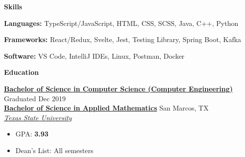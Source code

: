 \documentclass[10pt]{article}
\newlength{\headingborderwidth}
\newcommand{\resheading}[1]{
    \begin{mdframed}[
        backgroundcolor=black!15,
        linewidth=\headingborderwidth,
        innertopmargin=4pt,
        innerbottommargin=4pt,
        skipabove=6pt,
        skipbelow=2pt]
        \textbf{\large #1}
    \end{mdframed}
}
\newcommand{\dressubheading}[5]{
    \textbf{#1} \hfill #2 \\[0pt]
    \textbf{#3} \hfill #4 \\[0pt]
    \textit{#5} \\[0pt]
}
\newcommand{\ressubheading}[4]{
    \textbf{#1} \hfill #2 \\[0pt]
    \textit{#3} \hfill #4 \\[0pt]
}
\newenvironment{resitemize}{
    \vspace{-6pt}
    \begin{itemize}
    \setlength\itemsep{-2pt}
}{
    \end{itemize}
}
\begin{document}
\begin{NoHyper}
\resheading{Skills}

\textbf{Languages:}
    TypeScript/JavaScript,
    HTML,
    CSS,
    SCSS,
    Java,    
    C++,
    Python

\textbf{Frameworks:}
    React/Redux,
    Svelte,
    Jest,
    Testing Library,
    Spring Boot,
    Kafka

\textbf{Software:}
    VS Code,
    IntelliJ IDEs,
    Linux,
    Postman,
    Docker









%
%

\resheading{Education}

\dressubheading
	{\href{http://mycatalog.txstate.edu/undergraduate/science-engineering/computer/computer-science-concentration-engineering-bs/}{Bachelor of Science in Computer Science (Computer Engineering)}}
	{Graduated Dec 2019}
	{\href{http://mycatalog.txstate.edu/undergraduate/science-engineering/mathematics/applied-bs/}{Bachelor of Science in Applied Mathematics}}
    {San Marcos, TX}
    {\href{http://www.txstate.edu/}{Texas State University}}
    	\begin{resitemize}
    		\item GPA: \textbf{3.93}
    		\item Dean's List: All semesters
    	\end{resitemize}







\end{NoHyper}
\end{document}
